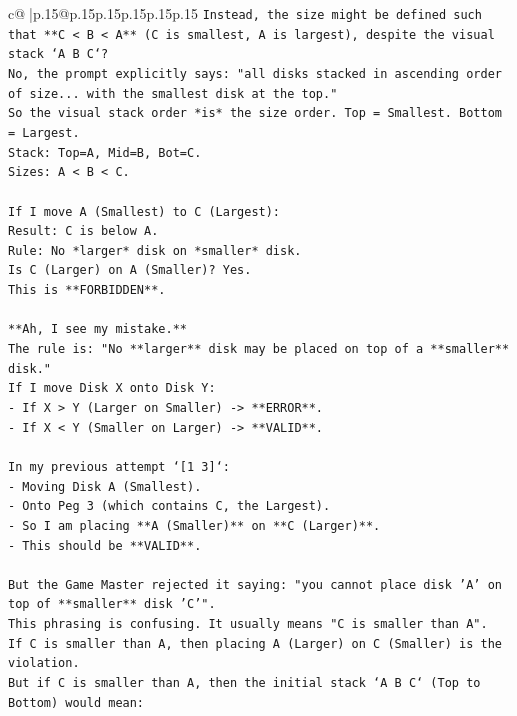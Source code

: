 \documentclass{article}
\begin{document}
{\begin{supertabular}{c@{$\;$}|p{.15\linewidth}@{}p{.15\linewidth}p{.15\linewidth}p{.15\linewidth}p{.15\linewidth}p{.15\linewidth}}
{{{\texttt{Instead, the size might be defined such that **C < B < A** (C is smallest, A is largest), despite the visual stack `A B C`?} \\
\texttt{No, the prompt explicitly says: "all disks stacked in ascending order of size... with the smallest disk at the top."} \\
\texttt{So the visual stack order *is* the size order. Top = Smallest. Bottom = Largest.} \\
\texttt{Stack: Top=A, Mid=B, Bot=C.} \\
\texttt{Sizes: A < B < C.} \\
\\ 
\texttt{If I move A (Smallest) to C (Largest):} \\
\texttt{Result: C is below A.} \\
\texttt{Rule: No *larger* disk on *smaller* disk.} \\
\texttt{Is C (Larger) on A (Smaller)? Yes.} \\
\texttt{This is **FORBIDDEN**.} \\
\\ 
\texttt{**Ah, I see my mistake.**} \\
\texttt{The rule is: "No **larger** disk may be placed on top of a **smaller** disk."} \\
\texttt{If I move Disk X onto Disk Y:} \\
\texttt{{-} If X > Y (Larger on Smaller) {-}> **ERROR**.} \\
\texttt{{-} If X < Y (Smaller on Larger) {-}> **VALID**.} \\
\\ 
\texttt{In my previous attempt `{[}1 3{]}`:} \\
\texttt{{-} Moving Disk A (Smallest).} \\
\texttt{{-} Onto Peg 3 (which contains C, the Largest).} \\
\texttt{{-} So I am placing **A (Smaller)** on **C (Larger)**.} \\
\texttt{{-} This should be **VALID**.} \\
\\ 
\texttt{But the Game Master rejected it saying: "you cannot place disk 'A' on top of **smaller** disk 'C'".} \\
\texttt{This phrasing is confusing. It usually means "C is smaller than A".} \\
\texttt{If C is smaller than A, then placing A (Larger) on C (Smaller) is the violation.} \\
\texttt{But if C is smaller than A, then the initial stack `A B C` (Top to Bottom) would mean:} \\
}}}
\end{supertabular}}
\end{document}
